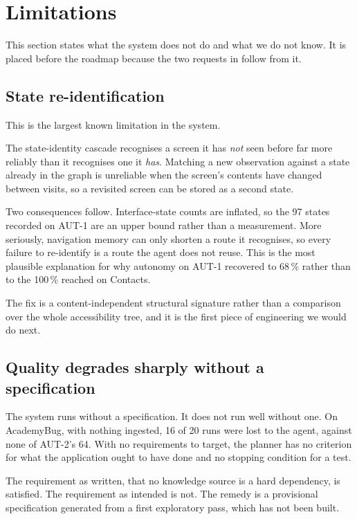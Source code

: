 \section{Limitations}
\label{sec:limits}

This section states what the system does not do and what we do not know. It is
placed before the roadmap because the two requests in  follow
from it.

\subsection{State re-identification}

This is the largest known limitation in the system.

The state-identity cascade recognises a screen it has \emph{not} seen before far
more reliably than it recognises one it \emph{has}. Matching a new observation
against a state already in the graph is unreliable when the screen's contents
have changed between visits, so a revisited screen can be stored as a second
state.

Two consequences follow. Interface-state counts are inflated, so the 97 states
recorded on AUT-1 are an upper bound rather than a measurement. More
seriously, navigation memory can only shorten a route it recognises, so every
failure to re-identify is a route the agent does not reuse. This is the most
plausible explanation for why autonomy on AUT-1 recovered to 68\,\%
rather than to the 100\,\% reached on Contacts.

The fix is a content-independent structural signature rather than a comparison
over the whole accessibility tree, and it is the first piece of engineering we
would do next.

\subsection{Quality degrades sharply without a specification}

The system runs without a specification. It does not run well without one. On
AcademyBug, with nothing ingested, 16 of 20 runs were lost to the agent, against
none of AUT-2's 64. With no requirements to target, the planner has no
criterion for what the application ought to have done and no stopping condition
for a test.

The requirement as written, that no knowledge source is a hard dependency, is
satisfied. The requirement as intended is not. The remedy is a provisional
specification generated from a first exploratory pass, which has not been built.

